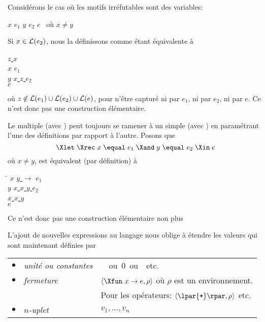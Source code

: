 Considérons le cas où les motifs irréfutables sont des variables:

\centerline{\Xlet{} $x$ \equal{} $e_1$ \Xand{} $y$ \equal{}
$e_2$ \Xin{} $e$ \ où $x \neq y$}
Si $x \in {\cal L} (e_2)$, nous la définissons comme étant équivalente à
\begin{center}
\begin{minipage}{0.3\linewidth}
\begin{tabbing}
\underline{\Xlet} \= \underline{$z$ \equal{} $x$ \Xin}\\
\> \Xlet{} $x$ \equal{} $e_1$ \Xin\\
\> \Xlet{} $y$ \equal{} \underline{\Xlet{} $x$ \equal{} $z$ \Xin} $e_2$\\
\Xin $e$
\end{tabbing}
\end{minipage}
\end{center}
où $z \not\in {\cal L} (e_1) \cup {\cal L} (e_2) \cup {\cal L} (e)$,
pour n'être capturé ni par $e_1$, ni par $e_2$, ni par $e$. Ce n'est
donc pas une construction élémentaire.

Le \Xlet{} \Xrec{} multiple (avec \Xand) peut toujours se ramener à un
\Xlet{} \Xrec{} simple (avec \Xin) en paramétrant l'une des
définitions par rapport à l'autre. Posons que
\[
\Xlet \; \Xrec \; x \; \equal \; e_1 \; \Xand \; y \; \equal \; e_2 \;
\Xin \; e
\]
où $x \neq y$, est équivalent (par définition) à
\begin{center}
\begin{minipage}{0.3\linewidth}
\begin{tabbing}
\Xlet{} \= \Xrec{} $x$ \equal{} \underline{\Xfun{} $y$
  $\rightarrow$} $e_1$ \Xin\\
\> \Xlet{} \Xrec{} $y$ \equal{} \underline{\Xlet{} $x$ \equal{} $x$ \lpar$y$\rpar{} \Xin} $e_2$ \Xin\\
\> \underline{\Xlet{} $x$ \equal{} $x$ \lpar$y$\rpar}\\
\underline{\Xin} $e$
\end{tabbing}
\end{minipage}
\end{center}
Ce n'est donc pas une construction élémentaire non plus

L'ajout de nouvelles expressions au langage nous oblige à étendre les
valeurs qui sont maintenant définies par

\begin{tabular}{rll}
    $\bullet$
  & \emph{unité ou constantes}
  & \unit \ ou \textsf{0} ou \Xtrue{} etc.\\
    $\bullet$
  & \emph{fermeture}
  & $\langle\Xfun \,\, x \rightarrow e, \rho\rangle$ où $\rho$ est un
    environnement.\\
  & 
  & Pour les opérateurs: $\langle\lpar{\texttt{+}}\rpar, \rho\rangle$
    etc.\\
    $\bullet$
  & \emph{$n$-uplet}
  & $v_1, \ldots, v_n$
\end{tabular}


